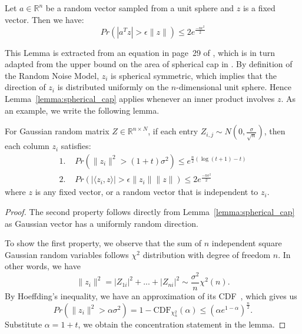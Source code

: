 \documentclass[twoside,11pt]{article}
\numberwithin{equation}{section}
\begin{document}
\begin{lemma}\label{lemma:spherical_cap}
  Let $a \in \mathbb{R}^{n}$ be a random vector sampled from a unit sphere and $z$ is a fixed vector. Then we have:
  \begin{equation*}
    Pr\left(|a^Tz|>\epsilon \|z\|\right) \leq 2e^{\frac{-n\epsilon^2}{2}}
  \end{equation*}
\end{lemma}
This Lemma is extracted from an equation in page~29 of \citet{soltanolkotabi2011geometric}, which is in turn adapted from the upper bound on the area of spherical cap in \citet{ball1997intro_convex_geometry}.
By definition of the Random Noise Model, $z_i$ is spherical symmetric, which implies that the direction of $z_i$ is distributed uniformly on the $n$-dimensional unit sphere. Hence Lemma~\ref{lemma:spherical_cap} applies whenever an inner product involves $z$.
As an example, we write the following lemma.
\begin{lemma}\label{lemma:random_gaussian}
  For Gaussian random matrix $Z\in \mathbb{R}^{n\times N}$, if each entry $Z_{i,j} \sim N(0,\frac{\sigma}{\sqrt{n}})$, then each column $z_i$ satisfies:
  \begin{align*}
      \text{1. }&Pr(\|z_i\|^2 > (1+t)\sigma^2) \leq e^{\frac{n}{2}(\log(t+1)-t)}\\
      \text{2. }&Pr(|\langle z_i,z \rangle|>\epsilon\|z_i\|\|z\|) \leq 2e^{\frac{-n\epsilon^2}{2}}
  \end{align*}
  where $z$ is any fixed vector, or a random vector that is independent to $z_i$.
\end{lemma}
\begin{proof}
The second property follows directly from Lemma~\ref{lemma:spherical_cap} as Gaussian vector has a uniformly random direction.

To show the first property, we observe that the sum of $n$ independent square Gaussian random variables follows $\chi^2$ distribution with degree of freedom $n$. In other words, we have
$$\|z_i\|^2 = |Z_{1i}|^2+...+|Z_{ni}|^2 \sim \frac{\sigma^2}{n}\chi^2(n).$$
By Hoeffding's inequality, we have an approximation of its CDF~\citep{dasgupta2002xi_square_concentration}, which gives us
$$Pr(\|z_i\|^2>\alpha\sigma^2)=1-\mathrm{CDF}_{\chi^2_n}(\alpha)\leq (\alpha e^{1-\alpha})^{\frac{n}{2}}.$$
Substitute $\alpha=1+t$, we obtain the concentration statement in the lemma.
\end{proof}
\end{document}
